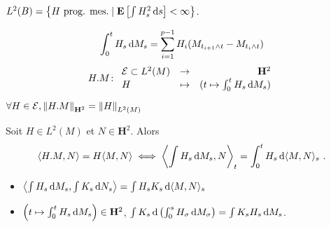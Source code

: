 \begin{rem}
	$L^2(B) = \left\{ H\ \text{prog. mes.} \mid \mathbf{E} \left[ \int H_s^2 \mathop{}\mathopen{}\mathrm{d} s \right] < \infty \right\}$.
\end{rem}

\begin{defn}
	$$\int_0^t H_s \mathop{}\mathopen{}\mathrm{d} M_s = \sum_{i = 1}^{p - 1} H_i (M_{t_{i + 1} \wedge t} - M_{t_i \wedge t})$$
	$$H.M \colon \begin{array}{lcr} \mathcal{E} \subset L^2(M) & \to & \mathbf{H}^2 \\ H & \mapsto & (t \mapsto \int_0^t H_s \mathop{}\mathopen{}\mathrm{d} M_s) \end{array}$$
\end{defn}

\begin{lem}
	$\forall H \in \mathcal{E}, \left\lVert H.M\right\rVert_{\mathbf{H}^2} = \left\lVert H\right\rVert_{L^2(M)}$
\end{lem}

\begin{thm}
	Soit $H \in L^2(M)$ et $N \in \mathbf{H}^2$.
	Alors
	$$\langle H.M, N \rangle = H \langle M,N \rangle \iff \left\langle \int H_s \mathop{}\mathopen{}\mathrm{d} M_s, N \right\rangle_t = \int_0^t H_s \mathop{}\mathopen{}\mathrm{d} \langle M,N \rangle_s\ .$$
\end{thm}

\begin{cor}
	\begin{itemize}
		\item[\textbullet] $\left\langle \int H_s \mathop{}\mathopen{}\mathrm{d} M_s, \int K_s \mathop{}\mathopen{}\mathrm{d} N_s \right\rangle = \int H_s K_s \mathop{}\mathopen{}\mathrm{d} \langle M,N \rangle_s$
		\item[\textbullet] $\left( t \mapsto \int_0^t H_s \mathop{}\mathopen{}\mathrm{d} M_s \right) \in \mathbf{H}^2$, $\int K_s \mathop{}\mathopen{}\mathrm{d} \left( \int_0^s H_\sigma \mathop{}\mathopen{}\mathrm{d} M_\sigma \right) = \int K_s H_s \mathop{}\mathopen{}\mathrm{d} M_s$.
	\end{itemize}
\end{cor}
